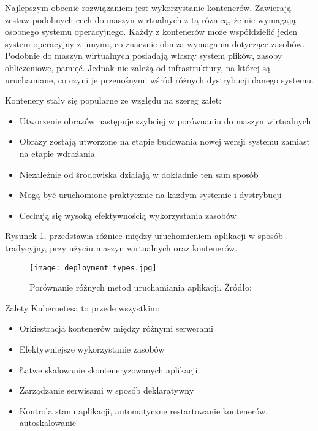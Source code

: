 Najlepszym obecnie rozwiązaniem jest wykorzystanie kontenerów. Zawierają zestaw 
podobnych cech do maszyn wirtualnych z tą różnicą, że nie wymagają osobnego systemu 
operacyjnego. Każdy z kontenerów może współdzielić jeden system operacyjny z 
innymi, co znacznie obniża wymagania dotyczące zasobów. Podobnie do maszyn 
wirtualnych posiadają własny system plików, zasoby obliczeniowe, pamięć. Jednak nie 
zależą od infrastruktury, na której są uruchamiane, co czyni je przenośnymi wśród 
różnych dystrybucji danego systemu.

Kontenery stały się popularne ze względu na szereg zalet:

\begin{itemize} %
    \item Utworzenie obrazów następuje szybciej w porównaniu do maszyn wirtualnych
    \item Obrazy zostają utworzone na etapie budowania nowej wersji systemu zamiast na etapie wdrażania
    \item Niezależnie od środowiska działają w dokładnie ten sam sposób
    \item Mogą być uruchomione praktycznie na każdym systemie i dystrybucji
    \item Cechują się wysoką efektywnością wykorzystania zasobów
\end{itemize}

Rysunek \ref{fig:deployment-types}. przedstawia różnice między uruchomieniem aplikacji w sposób 
tradycyjny, przy użyciu maszyn wirtualnych oraz kontenerów.

\begin{figure}[h]
    \centering
    \texttt{[image: deployment\_types.jpg]}
    \caption{Porównanie różnych metod uruchamiania aplikacji. Źródło: \cite{kubernetes2022}}
    \label{fig:deployment-types}
\end{figure}

Zalety Kubernetesa to przede wszystkim:

\begin{itemize} %
    \item Orkiestracja kontenerów między różnymi serwerami
    \item Efektywniejsze wykorzystanie zasobów
    \item Łatwe skalowanie skonteneryzowanych aplikacji 
    \item Zarządzanie serwisami w sposób deklaratywny
    \item Kontrola stanu aplikacji, automatyczne restartowanie kontenerów, 
    autoskalowanie
\end{itemize}

